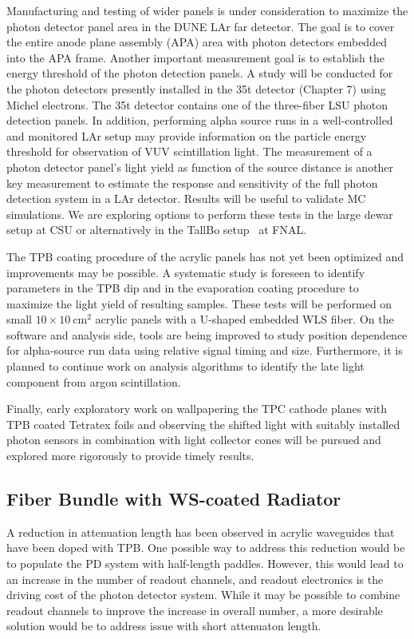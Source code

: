 Manufacturing and testing of wider panels is under consideration to
maximize the photon detector panel area in the DUNE LAr far
detector. The goal is to cover the entire anode plane assembly (APA)
area with photon detectors embedded into the APA frame.  Another
important measurement goal is to establish the energy threshold of the
photon detection panels. A study will be conducted for the photon
detectors presently installed in the 35t detector (Chapter 7) using
Michel electrons. The 35t detector contains one of the three-fiber LSU
photon detection panels. In addition, performing alpha source runs in
a well-controlled and monitored LAr setup may provide information on
the particle energy threshold for observation of VUV scintillation
light.  The measurement of a photon detector panel's light yield as
function of the source distance is another key measurement to estimate
the response and sensitivity of the full photon detection system in a
LAr detector. Results will be useful to validate MC simulations.  We
are exploring options to perform these tests in the large dewar setup
at CSU or alternatively in the TallBo setup~\cite{LAR_RD} at FNAL.

The TPB coating procedure of the acrylic panels has not yet been
optimized and improvements may be possible. A systematic
study is foreseen to identify parameters in the TPB dip and %
in the
evaporation coating procedure to maximize the light yield of resulting
samples. These tests will be performed on small
$10\times10~\mathrm{cm}^2$ acrylic panels with a U-shaped embedded WLS
fiber.  On the software and analysis side, %
tools are being improved to study position dependence for alpha-source run
data using relative signal timing and size. Furthermore, it is planned to
continue work on analysis algorithms to identify the late light
component from argon scintillation.

Finally, early exploratory work on wallpapering the TPC cathode planes
with TPB coated Tetratex foils and observing the shifted light with
suitably installed photon sensors in combination with light collector
cones will be pursued and explored more rigorously to provide timely
results.

\subsection{Fiber Bundle with WS-coated Radiator}

A reduction in attenuation length has been observed in acrylic
waveguides that have been doped with TPB. One possible way to address
this reduction would be to populate the PD system with half-length
paddles. However, this would lead to an increase in the number of
readout channels, and readout electronics is the driving cost of the
photon detector system. While it may be possible to combine readout
channels to improve the increase in overall number, a more desirable
solution would be to address issue with short attenuaton length.

